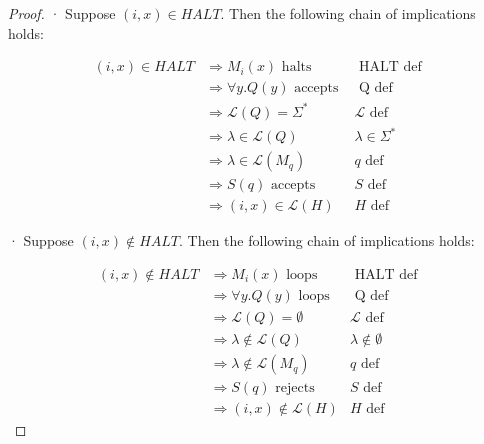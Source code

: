 \documentclass[10pt]{article}
\begin{document}
\begin{enumerate}[label={}]
\begin{proof}
                  · Suppose $(i, x) \in H A L T$. Then the following chain of implications holds:

                  $$
                        \begin{array}{rlr}
                              (i, x) \in H A L T & \Longrightarrow M_i(x) \text { halts }            & \text { HALT def }        \\
                                                 & \Longrightarrow \forall y. Q(y) \text { accepts } & \text { Q def }           \\
                                                 & \Longrightarrow \mathcal{L}(Q)=\Sigma^*           & \mathcal{L} \text { def } \\
                                                 & \Longrightarrow \lambda  \in \mathcal{L}(Q)       & \lambda \in \Sigma^*      \\
                                                 & \Longrightarrow \lambda  \in \mathcal{L}(M_q)     & q \text { def }           \\
                                                 & \Longrightarrow S(q) \text { accepts }            & S \text { def }           \\
                                                 & \Longrightarrow(i, x) \in \mathcal{L}(H)          & H \text { def }
                        \end{array}
                  $$

                  · Suppose $(i, x) \notin H A L T$. Then the following chain of implications holds:

                  $$
                        \begin{array}{rlr}
                              (i, x) \notin H A L T & \Longrightarrow M_i(x) \text { loops }          & \text { HALT def }        \\
                                                    & \Longrightarrow \forall y. Q(y) \text { loops } & \text { Q def }           \\
                                                    & \Longrightarrow \mathcal{L}(Q)=\emptyset        & \mathcal{L} \text { def } \\
                                                    & \Longrightarrow \lambda  \notin \mathcal{L}(Q)  & \lambda \notin \emptyset  \\
                                                    & \Longrightarrow \lambda \notin \mathcal{L}(M_q) & q \text { def }           \\
                                                    & \Longrightarrow S(q) \text { rejects }          & S \text { def }           \\
                                                    & \Longrightarrow(i, x) \notin \mathcal{L}(H)     & H \text { def }
                        \end{array}
                  $$



\end{proof}
\end{enumerate}
\end{document}
